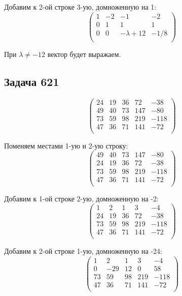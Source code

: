 	 Добавим к 2-ой строке 3-ую, домноженную на 1:
	 \[
	 \begin{pmatrix}
	 1 & -2 & -1 & -2 \\
	 0 & 1 & 1 & 1 \\
	 0 & 0 & -\lambda+12 & -1/8 \\
	 \end{pmatrix}
	 \]
	 
	 При $\lambda \not = -12$ вектор будет выражаем.
	 
	 
	 
	 \subsection{Задача 621}
	 \[
	 \begin{pmatrix}
	 24 & 19 & 36 & 72 & -38 \\
	 49 & 40 & 73 & 147 & -80 \\
	 73 & 59 & 98 & 219 & -118 \\
	 47 & 36 & 71 & 141 & -72 \\
	 \end{pmatrix}
	 \]
	 
	 Поменяем местами 1-ую и 2-ую строку:
	 \[
	 \begin{pmatrix}
	 49 & 40 & 73 & 147 & -80 \\
	 24 & 19 & 36 & 72 & -38 \\
	 73 & 59 & 98 & 219 & -118 \\
	 47 & 36 & 71 & 141 & -72 \\
	 \end{pmatrix}
	 \]
	 
	 Добавим к 1-ой строке 2-ую, домноженную на -2:
	 \[
	 \begin{pmatrix}
	 1 & 2 & 1 & 3 & -4 \\
	 24 & 19 & 36 & 72 & -38 \\
	 73 & 59 & 98 & 219 & -118 \\
	 47 & 36 & 71 & 141 & -72 \\
	 \end{pmatrix}
	 \]
	 
	 Добавим к 2-ой строке 1-ую, домноженную на -24:
	 \[
	 \begin{pmatrix}
	 1 & 2 & 1 & 3 & -4 \\
	 0 & -29 & 12 & 0 & 58 \\
	 73 & 59 & 98 & 219 & -118 \\
	 47 & 36 & 71 & 141 & -72 \\
	 \end{pmatrix}
	 \]
	 
